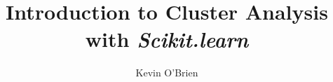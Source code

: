 \documentclass[12pt]{article}
\begin{document}
\author{Kevin O'Brien}
\title{Introduction to Cluster Analysis with \textbf{\textit{Scikit.learn}}}
\large
\tableofcontents
\newpage





\end{document}

